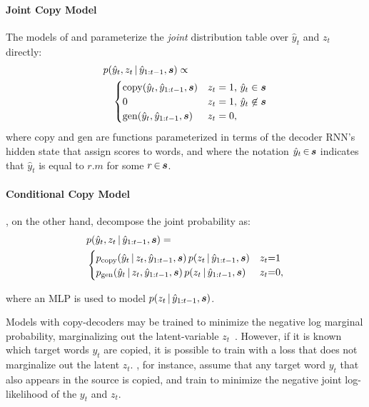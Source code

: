 \documentclass[11pt,letterpaper]{article}
\begin{document}
\paragraph{Joint Copy Model} The models of \citet{gu2016incorporating} and \citet{yang2016reference} parameterize the \textit{joint} distribution table over $\hat{y}_t$ and $z_t$ directly:
\begin{align*}
p(&\hat{y}_t, z_t \,|\, \hat{y}_{1:t-1}, \boldsymbol{s}) \propto \\ 
&\begin{cases} \mathrm{copy}( \hat{y}_{t}, \hat{y}_{1:t-1}, \boldsymbol{s}) &\mbox{$z_t = 1$, $\hat{y}_t \in \boldsymbol{s}$} \\
0 &\mbox{$z_t = 1$, $\hat{y}_t \not \in \boldsymbol{s}$} \\
\mathrm{gen}( \hat{y}_{t}, \hat{y}_{1:t-1}, \boldsymbol{s}) &\mbox{$z_t=0$}, \end{cases}
\end{align*}
where $\mathrm{copy}$ and $\mathrm{gen}$ are functions parameterized in terms of the decoder RNN's hidden state that assign scores to words, and where the notation $\hat{y}_t \, {\in} \, \boldsymbol{s}$ indicates that $\hat{y}_t$ is equal to $r.m$ for some $r \, {\in} \, \boldsymbol{s}$.

\paragraph{Conditional Copy Model} \citet{gulcehre2016pointing}, on the other hand, decompose the joint probability as:
\begin{align*}
&p(\hat{y}_t, z_t \,|\, \hat{y}_{1:t-1}, \boldsymbol{s}) = \\ &\begin{cases} p_{\mathrm{copy}}(\hat{y}_t \,|\, z_t, \hat{y}_{1:t-1}, \boldsymbol{s}) \, p(z_t \,|\, \hat{y}_{1:t-1}, \boldsymbol{s}) &\mbox{$z_t{=}1$} \\
p_{\mathrm{gen}}(\hat{y}_t \,|\, z_t, \hat{y}_{1:t-1}, \boldsymbol{s}) \, p(z_t \,|\, \hat{y}_{1:t-1}, \boldsymbol{s}) &\mbox{$z_t{=}0$}, \end{cases}
\end{align*}

\noindent where an MLP is used to model $p(z_t \,|\, \hat{y}_{1:t-1}, \boldsymbol{s})$. 

Models with copy-decoders may be trained to minimize the negative log marginal probability, marginalizing out the latent-variable $z_t$~\cite{gu2016incorporating,
yang2016reference,merity2016pointer}. However, if it is known which target words $y_t$ are copied, it is possible to train with a loss that does not marginalize out the latent $z_t$. \citet{gulcehre2016pointing}, for instance, assume that any target word $y_t$ that also appears in the source is copied, and train to minimize the negative joint log-likelihood of the $y_t$ and $z_t$. %
\end{document}
